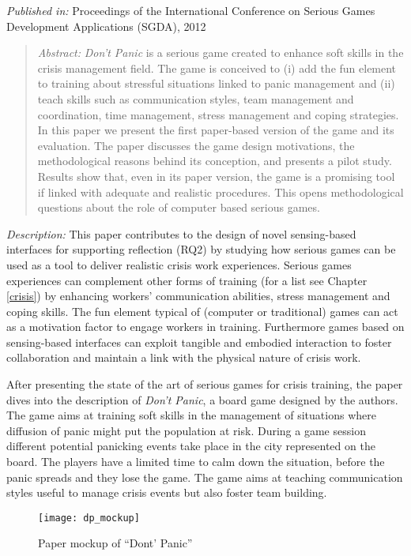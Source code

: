 \emph{Published in:} Proceedings of the International Conference on Serious Games Development Applications (SGDA), 2012 

\begin{quote}
	\emph{Abstract:} \emph{Don't Panic} is a serious game created to enhance soft skills in the crisis management field. The game is conceived to (i) add the fun element to training about stressful situations linked to panic management and (ii) teach skills such as communication styles, team management and coordination, time management, stress management and coping strategies. In this paper we present the first paper-based version of the game and its evaluation. The paper discusses the game design motivations, the methodological reasons behind its conception, and presents a pilot study. Results show that, even in its paper version, the game is a promising tool if linked with adequate and realistic procedures. This opens methodological questions about the role of computer based serious games. 
\end{quote}

\emph{Description:} This paper contributes to the design of novel sensing-based interfaces for supporting reflection (RQ2) by studying how serious games can be used as a tool to deliver realistic crisis work experiences. Serious games experiences can complement other forms of training (for a list see Chapter \ref{crisis}) by enhancing workers' communication abilities, stress management and coping skills. The fun element typical of (computer or traditional) games can act as a motivation factor to engage workers in training. Furthermore games based on sensing-based interfaces can exploit tangible and embodied interaction to foster collaboration and maintain a link with the physical nature of crisis work.

After presenting the state of the art of serious games for crisis training, the paper dives into the description of \emph{Don't Panic}, a board game designed by the authors. The game aims at training soft skills in the management of situations where diffusion of panic might put the population at risk. During a game session different potential panicking events take place in the city represented on the board. The players have a limited time to calm down the situation, before the panic spreads and they lose the game. The game aims at teaching communication styles useful to manage crisis events but also foster team building. 

\begin{figure}
	[tbh] \centering 
	\texttt{[image: dp\_mockup]} \caption{Paper mockup of “Dont’ Panic”} \label{fig:dp-mockup} 
\end{figure}

